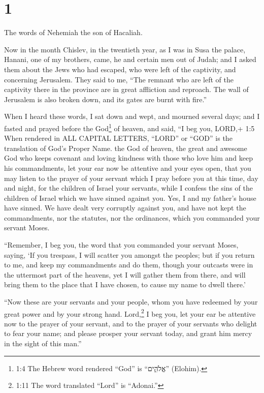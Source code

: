 \hypertarget{section}{%
\section{1}\label{section}}

 The words of Nehemiah the son of Hacaliah.

Now in the month Chislev, in the twentieth year, as I was in Susa the
palace,  Hanani, one of my brothers, came, he and certain
men out of Judah; and I asked them about the Jews who had escaped, who
were left of the captivity, and concerning Jerusalem.  They
said to me, ``The remnant who are left of the captivity there in the
province are in great affliction and reproach. The wall of Jerusalem is
also broken down, and its gates are burnt with fire.''

 When I heard these words, I sat down and wept, and mourned
several days; and I fasted and prayed before the God\footnote{1:4 The
  Hebrew word rendered ``God'' is ``אֱלֹהִ֑ים'' (Elohim).} of heaven,
 and said, ``I beg you, LORD,+ 1:5 When rendered in ALL
CAPITAL LETTERS, ``LORD'' or ``GOD'' is the translation of God's Proper
Name. the God of heaven, the great and awesome God who keeps covenant
and loving kindness with those who love him and keep his commandments,
 let your ear now be attentive and your eyes open, that you
may listen to the prayer of your servant which I pray before you at this
time, day and night, for the children of Israel your servants, while I
confess the sins of the children of Israel which we have sinned against
you. Yes, I and my father's house have sinned.  We have
dealt very corruptly against you, and have not kept the commandments,
nor the statutes, nor the ordinances, which you commanded your servant
Moses.

 ``Remember, I beg you, the word that you commanded your
servant Moses, saying, `If you trespass, I will scatter you amongst the
peoples;  but if you return to me, and keep my commandments
and do them, though your outcasts were in the uttermost part of the
heavens, yet I will gather them from there, and will bring them to the
place that I have chosen, to cause my name to dwell there.'

 ``Now these are your servants and your people, whom you
have redeemed by your great power and by your strong hand. 
Lord,\footnote{1:11 The word translated ``Lord'' is ``Adonai.''} I beg
you, let your ear be attentive now to the prayer of your servant, and to
the prayer of your servants who delight to fear your name; and please
prosper your servant today, and grant him mercy in the sight of this
man.''

